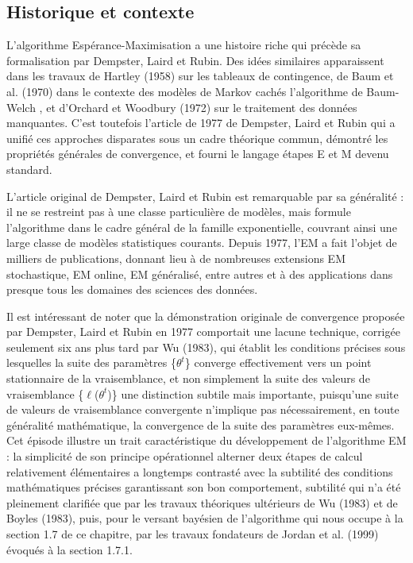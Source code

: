 \subsection{Historique et contexte}
L'algorithme Espérance-Maximisation a une histoire riche qui précède sa formalisation par Dempster, Laird et Rubin. Des idées similaires apparaissent dans les travaux de Hartley (1958) sur les tableaux de contingence, de Baum et al. (1970) dans le contexte des modèles de Markov cachés  l'algorithme de Baum-Welch , et d'Orchard et Woodbury (1972) sur le traitement des données manquantes. C'est toutefois l'article de 1977 de Dempster, Laird et Rubin qui a unifié ces approches disparates sous un cadre théorique commun, démontré les propriétés générales de convergence, et fourni le langage  étapes E et M  devenu standard.

L'article original de Dempster, Laird et Rubin est remarquable par sa généralité : il ne se restreint pas à une classe particulière de modèles, mais formule l'algorithme dans le cadre général de la famille exponentielle, couvrant ainsi une large classe de modèles statistiques courants. Depuis 1977, l'EM a fait l'objet de milliers de publications, donnant lieu à de nombreuses extensions  EM stochastique, EM online, EM généralisé, entre autres  et à des applications dans presque tous les domaines des sciences des données.

Il est intéressant de noter que la démonstration originale de convergence proposée par Dempster, Laird et Rubin en 1977 comportait une lacune technique, corrigée seulement six ans plus tard par Wu (1983), qui établit les conditions précises sous lesquelles la suite des paramètres \{$\theta ^{t}$\} converge effectivement vers un point stationnaire de la vraisemblance, et non simplement la suite des valeurs de vraisemblance \{$\ell $($\theta ^{t}$)\}  une distinction subtile mais importante, puisqu'une suite de valeurs de vraisemblance convergente n'implique pas nécessairement, en toute généralité mathématique, la convergence de la suite des paramètres eux-mêmes. Cet épisode illustre un trait caractéristique du développement de l'algorithme EM : la simplicité de son principe opérationnel  alterner deux étapes de calcul relativement élémentaires  a longtemps contrasté avec la subtilité des conditions mathématiques précises garantissant son bon comportement, subtilité qui n'a été pleinement clarifiée que par les travaux théoriques ultérieurs de Wu (1983) et de Boyles (1983), puis, pour le versant bayésien de l'algorithme qui nous occupe à la section 1.7 de ce chapitre, par les travaux fondateurs de Jordan et al. (1999) évoqués à la section 1.7.1.

